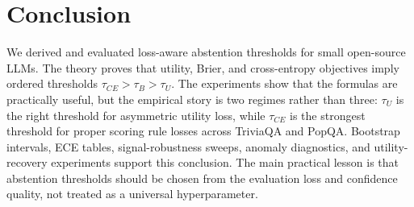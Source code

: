 \documentclass[letterpaper,10pt,twocolumn]{article}
\begin{document}
\section{Conclusion}

We derived and evaluated loss-aware abstention thresholds for small
open-source LLMs. The theory proves that utility, Brier, and cross-entropy
objectives imply ordered thresholds $\tau_{CE}>\tau_B>\tau_U$. The experiments
show that the formulas are practically useful, but the empirical story is two
regimes rather than three: $\tau_U$ is the right threshold for asymmetric
utility loss, while $\tau_{CE}$ is the strongest threshold for proper scoring
rule losses across TriviaQA and PopQA. Bootstrap intervals, ECE tables,
signal-robustness sweeps, anomaly diagnostics, and utility-recovery
experiments support this conclusion. The main practical lesson is that
abstention thresholds should be chosen from the evaluation loss and confidence
quality, not treated as a universal hyperparameter.
\end{document}

